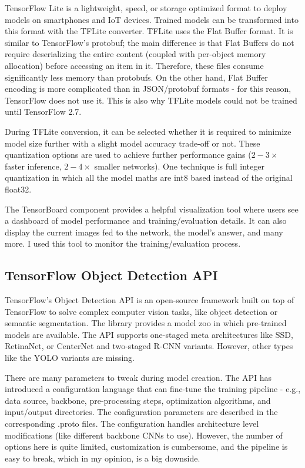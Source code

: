 TensorFlow Lite is a lightweight, speed, or storage optimized format to deploy models on smartphones and IoT devices. Trained models can be transformed into this format with the TFLite converter. TFLite uses the Flat Buffer\cite{Flatbuf} format. It is similar to TensorFlow's protobuf; the main difference is that Flat Buffers do not require deserializing the entire content (coupled with per-object memory allocation) before accessing an item in it. Therefore, these files consume significantly less memory than protobufs. On the other hand, Flat Buffer encoding is more complicated than in JSON/protobuf formats - for this reason, TensorFlow does not use it. This is also why TFLite models could not be trained until TensorFlow 2.7\cite{TensorFlowLiteTraining}.

During TFLite conversion, it can be selected whether it is required to minimize model size further with a slight model accuracy trade-off or not. These quantization options are used to achieve further performance gains ($2-3\times$ faster inference, $2-4\times$ smaller networks). One technique is full integer quantization\cite{TensorFlowQuant} in which all the model maths are int8 based instead of the original float32.

The TensorBoard component provides a helpful visualization tool where users see a dashboard of model performance and training/evaluation details. It can also display the current images fed to the network, the model's answer, and many more. I used this tool to monitor the training/evaluation process.

\subsection{TensorFlow Object Detection API}

TensorFlow's Object Detection API\cite{TensorFlowObjDetAPI} is an open-source framework built on top of TensorFlow to solve complex computer vision tasks, like object detection or semantic segmentation. The library provides a model zoo in which pre-trained models are available. The API supports one-staged meta architectures like SSD, RetinaNet, or CenterNet and two-staged R-CNN variants. However, other types like the YOLO variants are missing.

There are many parameters to tweak during model creation. The API has introduced a configuration language that can fine-tune the training pipeline - e.g., data source, backbone, pre-processing steps, optimization algorithms, and input/output directories. The configuration parameters are described in the corresponding .proto files. The configuration handles architecture level modifications (like different backbone CNNs to use). However, the number of options here is quite limited, customization is cumbersome, and the pipeline is easy to break, which in my opinion, is a big downside.

